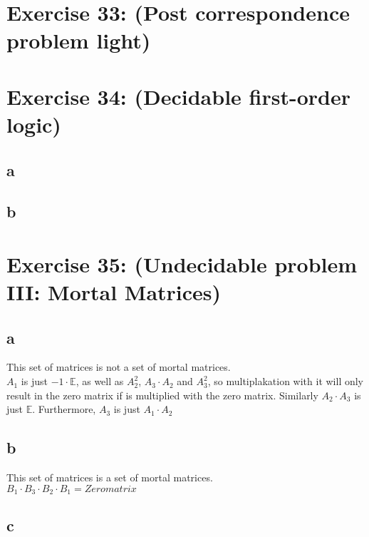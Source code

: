 \documentclass[12pt]{article}
\begin{document}
 

\rhead{\today}


\section*{Exercise 33: (Post correspondence problem light)}

\section*{Exercise 34: (Decidable first-order logic)}
\subsection*{a}
\subsection*{b}

\section*{Exercise 35: (Undecidable problem III: Mortal Matrices)}
\subsection*{a}
This set of matrices is not a set of mortal matrices.\\
$A_1$ is just $-1 \cdot \mathbb{E}$, as well as $A_2^2$, $A_3 \cdot A_2$ and $A_3^2$, so multiplakation with it will only result in the zero matrix if is multiplied with the zero matrix. Similarly $A_2 \cdot A_3$ is just $\mathbb{E}$. Furthermore, $A_3$ is just $A_1 \cdot A_2$

\subsection*{b}
This set of matrices is a set of mortal matrices.\\

$ B_1 \cdot B_3 \cdot B_2 \cdot B_1 = Zeromatrix$

\subsection*{c}
\end{document}
